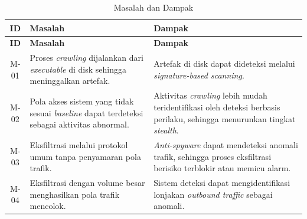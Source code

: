 \begin{longtable}{|c|p{6cm}|p{6.2cm}|}
\caption{Masalah dan Dampak}
\label{tbl:masalah-dampak} \\
\hline
\textbf{ID} & \textbf{Masalah} & \textbf{Dampak} \\
\hline
\endfirsthead

\hline
\textbf{ID} & \textbf{Masalah} & \textbf{Dampak} \\
\hline
\endhead

\hline
\endfoot

M-01 &
Proses \textit{crawling} dijalankan dari \textit{executable} di disk sehingga meninggalkan artefak. &
Artefak di disk dapat dideteksi melalui \textit{signature-based scanning}. \\
\hline

M-02 &
Pola akses sistem yang tidak sesuai \textit{baseline} dapat terdeteksi sebagai aktivitas abnormal. &
Aktivitas \textit{crawling} lebih mudah teridentifikasi oleh deteksi berbasis perilaku, sehingga menurunkan tingkat \textit{stealth}. \\
\hline

M-03 &
Eksfiltrasi melalui protokol umum tanpa penyamaran pola trafik. &
\textit{Anti-spyware} dapat mendeteksi anomali trafik, sehingga proses eksfiltrasi berisiko terblokir atau memicu alarm. \\
\hline

M-04 &
Eksfiltrasi dengan volume besar menghasilkan pola trafik mencolok. &
Sistem deteksi dapat mengidentifikasi lonjakan \textit{outbound traffic} sebagai anomali. \\
\hline

\end{longtable}
